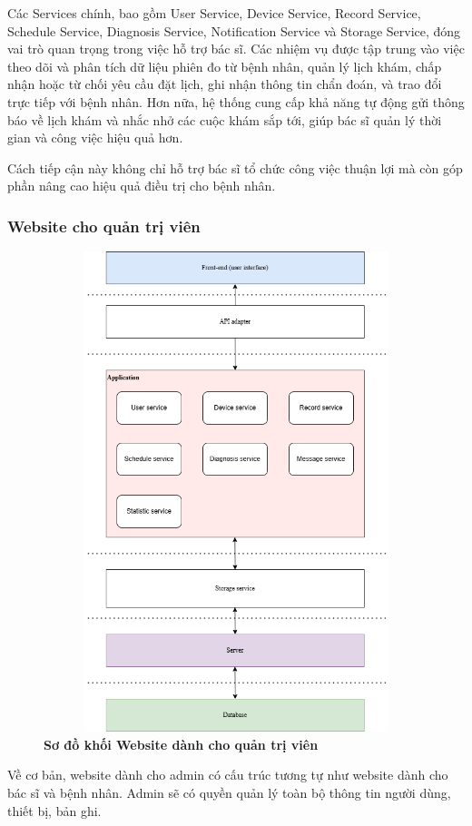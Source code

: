 Các Services chính, bao gồm User Service, Device Service, Record Service, Schedule Service, Diagnosis Service, Notification Service và Storage Service, đóng vai trò quan trọng trong việc hỗ trợ bác sĩ.
Các nhiệm vụ được tập trung vào việc theo dõi và phân tích dữ liệu phiên đo từ bệnh nhân, quản lý lịch khám, chấp nhận hoặc từ chối yêu cầu đặt lịch, ghi nhận thông tin chẩn đoán, và trao đổi trực tiếp với bệnh nhân.
Hơn nữa, hệ thống cung cấp khả năng tự động gửi thông báo về lịch khám và nhắc nhở các cuộc khám sắp tới, giúp bác sĩ quản lý thời gian và công việc hiệu quả hơn.

Cách tiếp cận này không chỉ hỗ trợ bác sĩ tổ chức công việc thuận lợi mà còn góp phần nâng cao hiệu quả điều trị cho bệnh nhân.

\subsubsection{Website cho quản trị viên}
\begin{figure}[H]
  \centering
  \includegraphics[width=12cm,height=14cm]{Images/System/fmECG_architecture-Admin.drawio.png}
  \caption[Sơ đồ khối Website dành cho quản trị viên]{\bfseries \fontsize{12pt}{0pt}\selectfont Sơ đồ khối Website dành cho quản trị viên}
  \label{fmECG_architecture-Admin} %
\end{figure}
Về cơ bản, website dành cho admin có cấu trúc tương tự như website dành cho bác sĩ và bệnh nhân.
Admin sẽ có quyền quản lý toàn bộ thông tin người dùng, thiết bị, bản ghi.

